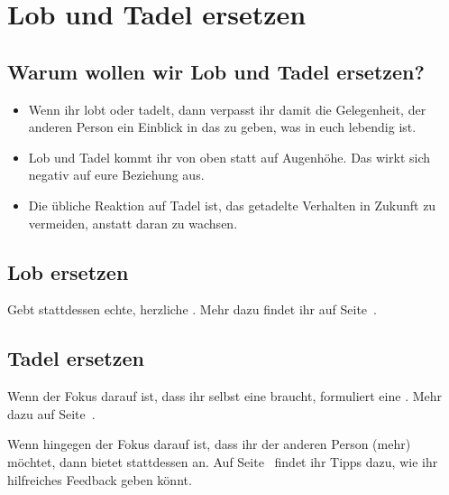 \section{Lob und Tadel ersetzen}
\label{lob-tadel}

\subsection{Warum wollen wir Lob und Tadel ersetzen?}

\begin{itemize}
  \item Wenn ihr lobt oder tadelt, dann verpasst ihr damit die Gelegenheit, der anderen Person ein Einblick in das zu geben, was in euch lebendig ist.
  \item Lob und Tadel kommt ihr von oben statt auf Augenhöhe. Das wirkt sich negativ auf eure Beziehung aus.
  \item Die übliche Reaktion auf Tadel ist, das getadelte Verhalten in Zukunft zu vermeiden, anstatt daran zu wachsen.
\end{itemize}


\subsection{Lob ersetzen}

Gebt stattdessen echte, herzliche . Mehr dazu findet ihr auf Seite~\pageref{wertschaetzung}.


\subsection{Tadel ersetzen}

Wenn der Fokus darauf ist, dass ihr selbst eine  braucht, formuliert eine . Mehr dazu auf Seite~\pageref{bitten}.

Wenn hingegen der Fokus darauf ist, dass ihr der anderen Person (mehr)  möchtet, dann bietet stattdessen  an. Auf Seite~\pageref{feedback-regeln} findet ihr Tipps dazu, wie ihr hilfreiches Feedback geben könnt.
